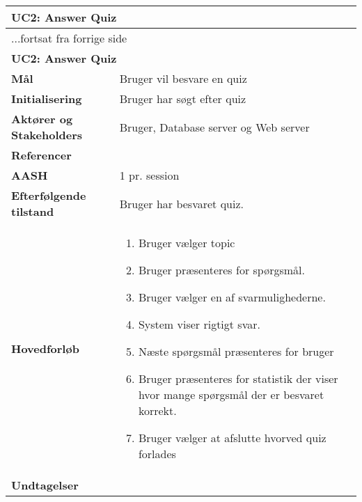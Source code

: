 \begin{center} \centering \label{ucAnswerQuiz}
	\begin{longtable}{|p{4.6cm}|p{9.4cm}|}  %
		\hline
		\multicolumn{2}{|l|}{\textbf{UC2: Answer Quiz}} \\\hline
		\endfirsthead
		
		\multicolumn{2}{l}{...fortsat fra forrige side} \\ \hline %
		\multicolumn{2}{|l|}{\textbf{UC2: Answer Quiz}} \\\hline
		\endhead	
		
		\textbf{Mål}						&Bruger vil besvare en quiz
		\\\hline
		\textbf{Initialisering}			&Bruger har søgt efter quiz
		\\\hline
		\textbf{Aktører og Stakeholders}	&Bruger, Database server og Web server
		\\\hline 
		\textbf{Referencer}				&
		\\\hline
		\textbf{AASH}					&1 pr. session
		\\\hline
		\textbf{Efterfølgende tilstand}	&Bruger har besvaret quiz.
		\\\hline
		\textbf{Hovedforløb}					
			&\begin{enumerate}
			\item Bruger vælger topic
			\item\label{ucAnswerQuizQPresent} Bruger præsenteres for spørgsmål.
			\item Bruger vælger en af svarmulighederne. 
			\item System viser rigtigt svar.

			\item\label{ucAnswerQuizQEnd} Næste spørgsmål præsenteres for bruger \newline
			[Punkt \ref{ucAnswerQuizQPresent} - \ref{ucAnswerQuizQEnd} gentages indtil der ikke er flere spørgsmål i quiz]
			\item Bruger præsenteres for statistik der viser hvor mange spørgsmål der er 	besvaret korrekt.
			\item Bruger vælger at afslutte hvorved quiz forlades


			\end{enumerate}\\\hline
		\textbf{Undtagelser}
			&			
			\\\hline
	\end{longtable} 
\end{center}